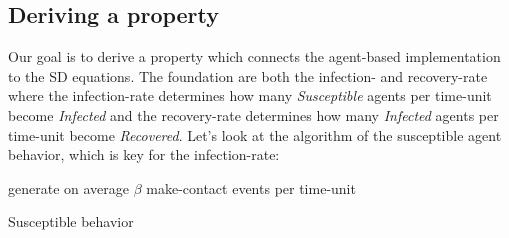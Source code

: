 %
%
%

%

\subsection{Deriving a property}
Our goal is to derive a property which connects the agent-based implementation to the SD equations. The foundation are both the infection- and recovery-rate where the infection-rate determines how many \textit{Susceptible} agents per time-unit become \textit{Infected} and the recovery-rate determines how many \textit{Infected} agents per time-unit become \textit{Recovered}. Let's look at the algorithm of the susceptible agent behavior, which is key for the infection-rate:

\begin{algorithm}
generate on average $\beta$ make-contact events per time-unit\; 
\caption{Susceptible behavior}
\end{algorithm}

